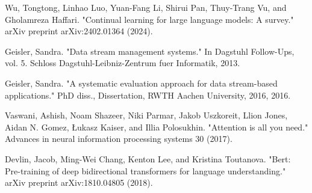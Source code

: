 \documentclass[runningheads]{llncs}
\begin{document}
\begin{thebibliography}{8}


Wu, Tongtong, Linhao Luo, Yuan-Fang Li, Shirui Pan, Thuy-Trang Vu, and Gholamreza Haffari. "Continual learning for large language models: A survey." arXiv preprint arXiv:2402.01364 (2024).




Geisler, Sandra. "Data stream management systems." In Dagstuhl Follow-Ups, vol. 5. Schloss Dagstuhl-Leibniz-Zentrum fuer Informatik, 2013.

Geisler, Sandra. "A systematic evaluation approach for data stream-based applications." PhD diss., Dissertation, RWTH Aachen University, 2016, 2016.

Vaswani, Ashish, Noam Shazeer, Niki Parmar, Jakob Uszkoreit, Llion Jones, Aidan N. Gomez, Łukasz Kaiser, and Illia Polosukhin. "Attention is all you need." Advances in neural information processing systems 30 (2017).

Devlin, Jacob, Ming-Wei Chang, Kenton Lee, and Kristina Toutanova. "Bert: Pre-training of deep bidirectional transformers for language understanding." arXiv preprint arXiv:1810.04805 (2018).



\end{thebibliography}
\end{document}
